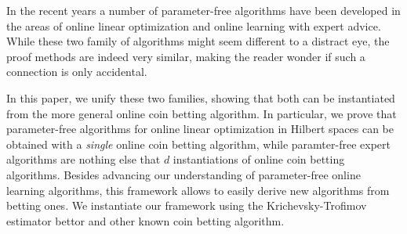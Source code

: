 In the recent years a number of parameter-free algorithms have been developed in the areas of online linear optimization and online learning with expert advice. While these two family of algorithms might seem different to a distract eye, the proof methods are indeed very similar, making the reader wonder if such a connection is only accidental.

In this paper, we unify these two families, showing that both can be instantiated from the more general online coin betting algorithm. 
In particular, we prove that parameter-free algorithms for online linear optimization in Hilbert spaces can be obtained with a \emph{single} online coin betting algorithm, while paramter-free expert algorithms are nothing else that $d$ instantiations of online coin betting algorithms.
Besides advancing our understanding of parameter-free online learning algorithms, this framework allows to easily derive new algorithms from betting ones. We instantiate our framework using the Krichevsky-Trofimov estimator bettor and other known coin betting algorithm.
